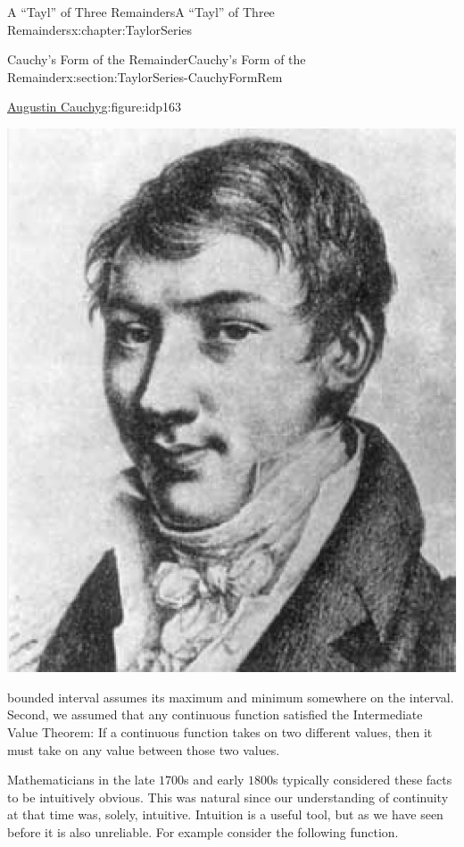 \begin{chapterptx}{A ``Tayl'' of Three Remainders}{}{A ``Tayl'' of Three Remainders}{}{}{x:chapter:TaylorSeries}
\begin{sectionptx}{Cauchy's Form of the Remainder}{}{Cauchy's Form of the Remainder}{}{}{x:section:TaylorSeries-CauchyFormRem}
		\begin{figureptx}{\href{https://mathshistory.st-andrews.ac.uk/Biographies/Cauchy/}{Augustin Cauchy}\protect\footnotemark{}}{g:figure:idp163}{}%
			\begin{image}{0.36}{0.28}{0.36}%
				\includegraphics[width=\linewidth]{external/images/Cauchy.png}
			\end{image}%
			\tcblower
		\end{figureptx}%
		bounded interval assumes its maximum and minimum somewhere on the interval. Second, we assumed that any continuous function satisfied the Intermediate Value Theorem: If a continuous function takes on two different values, then it must take on any value between those two values.%
		\par
		Mathematicians in the late \(1700\)s and early \(1800\)s typically considered these facts to be intuitively obvious.  This was natural since our understanding of continuity at that time was, solely, intuitive.  Intuition is a useful tool, but as we have seen before it is also unreliable.  For example consider the following function.%

\end{sectionptx}
\end{chapterptx}
